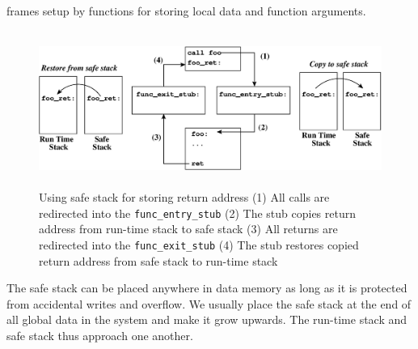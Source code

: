 frames setup by functions for storing local data and function
arguments.
%
\begin{figure}[htbp]
   \centering
   \includegraphics[height=2.0in, keepaspectratio=true]{figures/safe_stack.eps} 
   \caption[Using safe stack for storing return address]{Using safe
     stack for storing return address (1) All calls are redirected
     into the \texttt{func\_entry\_stub} (2) The stub copies return
     address from run-time stack to safe stack (3) All returns are
     redirected into the \texttt{func\_exit\_stub} (4) The stub
     restores copied return address from safe stack to run-time stack}
   \label{fig:safestack}
\end{figure}

The safe stack can be placed anywhere in data memory as long as it is
protected from accidental writes and overflow.
%
We usually place the safe stack at the end of all global data in the
system and make it grow upwards.
%
The run-time stack and safe stack thus approach one another.
%
%
%
%
%
%
%
